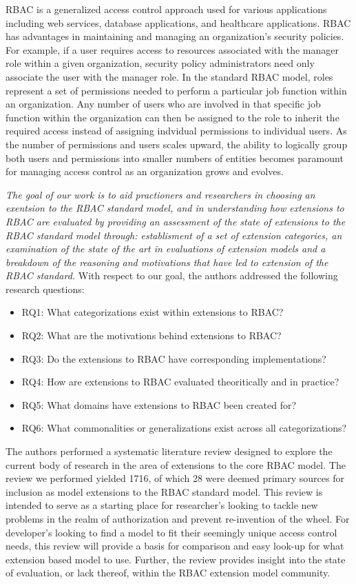 RBAC is a generalized access control approach used for various applications including web services, database applications, and healthcare applications.  
RBAC has advantages in maintaining and managing an organization's security policies.  
For example, if a user requires access to resources associated with the manager role within a given organization, security policy administrators need only associate the user with the manager role.
In the standard RBAC model, roles represent a set of permissions needed to perform a particular job function within an organization.  
Any number of users who are involved in that specific job function within the organization can then be assigned to the role to inherit the required access instead of assigning indvidual permissions to individual users. 
As the number of permissions and users scales upward, the ability to logically group both users and permissions into smaller numbers of entities becomes paramount for managing access control as an organization grows and evolves.

\textit{The goal of our work is to aid practioners and researchers in choosing an exentsion to the RBAC standard model, and in understanding
how extensions to RBAC are evaluated by providing an assessment of the state of extensions to the RBAC standard model through: establisment of a 
set of extension categories, an examination of the state of the art in evaluations of extension models and a breakdown of the reasoning and motivations
that have led to extension of the RBAC standard.} With respect to our goal, the authors addressed the following research questions:

\begin{itemize}
\setlength{\itemsep}{0.25pt}
\item RQ1: What categorizations exist within extensions to RBAC?
\item RQ2: What are the motivations behind extensions to RBAC?
\item RQ3: Do the extensions to RBAC have corresponding implementations?
\item RQ4: How are extensions to RBAC evaluated theoritically and in practice?
\item RQ5: What domains have extensions to RBAC been created for?
\item RQ6: What commonalities or generalizations exist across all categorizations?
\end{itemize}

The authors performed a systematic literature review designed to explore the current body of research in the area of extensions to the core RBAC model.  The review we performed yielded 1716, of which 28 were deemed primary sources for inclusion as model extensions to the RBAC standard model.  This review is intended to serve as a starting place for researcher's looking to tackle new problems in the realm of authorization and prevent re-invention of the wheel. For developer's looking to find a model to fit their seemingly unique access control needs, this review will provide a basis for comparison and easy look-up for what extension based model to use.  Further, the review provides insight into the state of evaluation, or lack thereof, within the RBAC extension model community.

